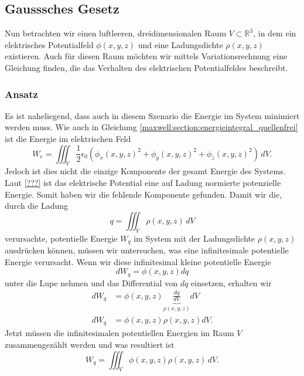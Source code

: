 %
%
%
%
\subsection{Gausssches Gesetz
\label{maxwell:section:elektrostatik_mit_quelle}}
Nun betrachten wir einen luftleeren, dreidimensionalen Raum $V\subset\mathbb{R}^3$, in dem ein elektrisches Potentialfeld $\phi(x,y,z)$ und eine Ladungsdichte $\rho(x,y,z)$ existieren.
Auch für diesen Raum möchten wir mittels Variationsrechnung eine Gleichung finden, die das Verhalten des elektrischen Potentialfeldes beschreibt.

\subsubsection{Ansatz}
Es ist naheliegend, dass auch in diesem Szenario die Energie im System minimiert werden muss.
Wie auch in Gleichung \eqref{maxwell:section:energieintegral_quellenfrei} ist die Energie im elektrischen Feld
\[
W_e
=
\iiint_V \frac{1}{2}\epsilon_0\left(\phi_x(x,y,z)^2 + \phi_y(x,y,z)^2 + \phi_z(x,y,z)^2\right)\, dV.
\]
Jedoch ist dies nicht die einzige Komponente der gesamt Energie des Systems.
Laut \ref{???} ist das elektrische Potential eine auf Ladung normierte potenzielle Energie.
Somit haben wir die fehlende Komponente gefunden.
Damit wir die, durch die Ladung
\begin{equation}
q
=
\iiint_V \rho(x,y,z)\, dV
\label{maxwell:ladung}
\end{equation}
verursachte, potentielle Energie $W_q$ im System mit der Ladungsdichte $\rho(x,y,z)$ ausdrücken können, müssen wir untersuchen, was eine infinitesimale potentielle Energie verursacht.
Wenn wir diese infinitesimal kleine potentielle Energie
\[
dW_q
=
\phi(x,y,z)dq
\]
unter die Lupe nehmen und das Differential von $dq$ einsetzen, erhalten wir
\begin{align*}
dW_q
&=
\phi(x,y,z)\underbrace{\frac{dq}{dV}}_{\rho(x,y,z)}dV
\\
dW_q
&=
\phi(x,y,z)\rho(x,y,z)dV.
\end{align*}
Jetzt müssen die infinitesimalen potentiellen Energien im Raum $V$ zusammengezählt werden und was resultiert ist
\begin{equation}
W_q
=
\iiint_V \phi(x,y,z)\rho(x,y,z)\, dV.
\label{maxwell:section:potenzielle_energie_ladung}
\end{equation}

